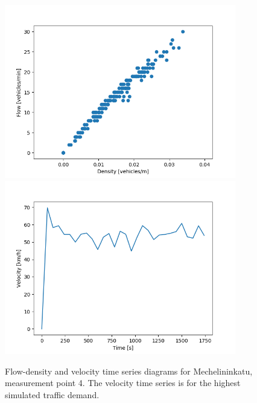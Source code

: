 \documentclass[english, 12pt, a4paper, elec, utf8, pdfa, online]{aaltothesis}
\begin{document}
\begin{figure}[ht!]
    \centering
    \includegraphics[width=0.9\textwidth]{graphs/Mechelininkatu_4_flw_dns.png}
    \includegraphics[width=0.9\textwidth]{graphs/Mechelininkatu_4_spd_time_6.png}
    \caption{Flow-density and velocity time series diagrams for Mechelininkatu, measurement point 4. The velocity time series is for the highest simulated traffic demand.}
    \label{fig:3}
\end{figure}
\end{document}
